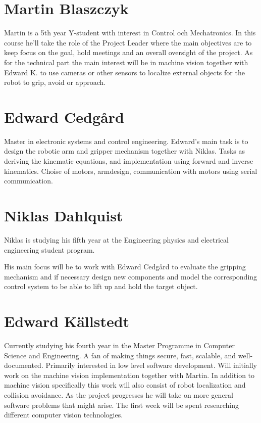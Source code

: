 
\section*{Martin Blaszczyk}
Martin is a 5th year Y-student with interest in Control och Mechatronics. 
In this course he'll take the role of the Project Leader where the main objectives
are to keep focus on the goal, hold meetings and an overall oversight of the project. 
As for the technical part the main interest will be in machine vision together with
Edward K. to use cameras or other sensors to localize external objects for the 
robot to grip, avoid or approach.

\section*{Edward Cedgård}

Master in  electronic systems and control engineering.
Edward's main task is to design the robotic arm and gripper mechanism together with Niklas. 
Tasks as deriving the kinematic equations, and implementation using forward and inverse kinematics.
Choise of motors, armdesign, communication with motors using serial communication. 

\section*{Niklas Dahlquist}
Niklas is studying his fifth year at the Engineering physics and electrical engineering student program.

His main focus will be to work with Edward Cedgård to evaluate the gripping mechanism and if necessary design new components and model the corresponding control system to be able to lift up and hold the target object.

\section*{Edward Källstedt}
Currently studying his fourth year in the Master Programme in Computer Science and Engineering.
A fan of making things secure, fast, scalable, and well-documented. Primarily interested in
low level software development. Will initially work on the machine vision implementation 
together with Martin. In addition to machine vision specifically this work will also consist
of robot localization and collision avoidance. As the project progresses he will take on more
general software problems that might arise. The first week will be spent researching different
computer vision technologies.


